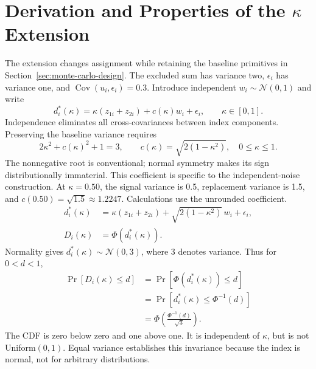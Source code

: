 \clearpage
\section{Derivation and Properties of the \texorpdfstring{$\kappa$}{kappa} Extension}
\label{app:kappa-derivation}
\setcounter{equation}{0}\setcounter{table}{0}\setcounter{figure}{0}
The extension changes assignment while retaining the baseline primitives in Section~\ref{sec:monte-carlo-design}. The excluded sum has variance two, $\epsilon_i$ has variance one, and $\operatorname{Cov}(u_i,\epsilon_i)=0.3$. Introduce independent $w_i\sim\mathcal N(0,1)$ and write
\begin{equation}
 d_i^*(\kappa)=\kappa(z_{1i}+z_{2i})+c(\kappa)w_i+\epsilon_i,
 \qquad \kappa\in[0,1].
 \label{eq:appendix-kappa-unknown}
\end{equation}
Independence eliminates all cross-covariances between index components. Preserving the baseline variance requires
\[
2\kappa^2+c(\kappa)^2+1=3,
\qquad c(\kappa)=\sqrt{2(1-\kappa^2)},\quad 0\le\kappa\le1.
\]
The nonnegative root is conventional; normal symmetry makes its sign distributionally immaterial. This coefficient is specific to the independent-noise construction. At $\kappa=0.50$, the signal variance is 0.5, replacement variance is 1.5, and $c(0.50)=\sqrt{1.5}\approx1.2247$. Calculations use the unrounded coefficient.
\begin{equation}
 \begin{aligned}
 d_i^*(\kappa)&=\kappa(z_{1i}+z_{2i})+\sqrt{2(1-\kappa^2)}\,w_i+\epsilon_i,\\
 D_i(\kappa)&=\Phi\!\left(d_i^*(\kappa)\right).
 \end{aligned}
 \label{eq:appendix-kappa-assignment}
\end{equation}
Normality gives $d_i^*(\kappa)\sim\mathcal N(0,3)$, where 3 denotes variance. Thus for $0<d<1$,
\begin{equation}
 \begin{aligned}
 \Pr\!\left[D_i(\kappa)\le d\right]
 &=\Pr\!\left[\Phi(d_i^*(\kappa))\le d\right]\\
 &=\Pr\!\left[d_i^*(\kappa)\le\Phi^{-1}(d)\right]\\
 &=\Phi\!\left(\frac{\Phi^{-1}(d)}{\sqrt{3}}\right).
 \end{aligned}
 \label{eq:appendix-treatment-cdf}
\end{equation}
The CDF is zero below zero and one above one. It is independent of $\kappa$, but is not Uniform$(0,1)$. Equal variance establishes this invariance because the index is normal, not for arbitrary distributions.

